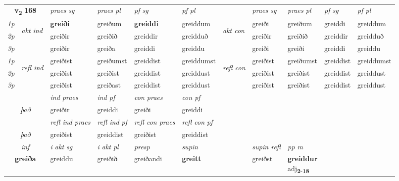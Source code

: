 \noindent
\begin{tabular}{lllllllllll} \toprule
\multicolumn{2}{c}{\textbf{v{\textsubscript{2}}} \Large{\textbf{168}}}  &  \textit{praes sg}  & \textit{praes pl}  &\textit{ pf sg} & \textit{pf pl} &  &  \textit{praes sg}  & \textit{praes pl}  & \textit{pf sg} & \textit{pf pl } \\*
	\cmidrule{3-6} \cmidrule{8-11}
 {\textit{1p}} & \multirow{3}{*}{\begin{turn}{90}\textit{akt ind}\end{turn}} & \textbf{greiði} & greiðum & \textbf{greiddi} & greiddum & \multirow{3}{*}{\begin{turn}{90}\textit{akt con}\end{turn}} &greiði & greiðum & greiddi & greiddum\\*
 {\textit{2p}} &  &  greiðir  & greiðið & greiddir & greidduð & & greiðir & greiðið & greiddir & greidduð \\*
{\textit{3p}} &  & greiðir & greiða & greiddi & greiddu & & greiði & greiði& greiddi & greiddu \\*
\cmidrule{3-6} \cmidrule{8-11}
 {\textit{1p}} & \multirow{3}{*}{\begin{turn}{90}\textit{refl ind}\end{turn}}  & greiðist & greiðumst & greiddist & greiddumst & \multirow{3}{*}{\begin{turn}{90}\textit{refl con}\end{turn}}  &greiðist & greiðumst & greiddist & greiddumst \\*
 {\textit{2p}} &  & greiðist & greiðist & greiddist & greiddust & &greiðist & greiðist & greiddist & greiddust \\*
 {\textit{3p}}  & & greiðist & greiðast & greiddist & greiddust & & greiðist & greiðist& greiddist & greiddust \\*
\cmidrule{3-6} \cmidrule{8-11}

   & &  \textit{ind praes} & \textit{ind pf} & \textit{con praes} & \textit{con pf} \\*
\multicolumn{2}{c}{ \textit{það} } & greiðir & greiddi & greiði & greiddi \\*

\cmidrule{3-6}
 & & \textit{refl ind praes} & \textit{refl ind pf} & \textit{refl con praes} & \textit{refl con pf} \\*
 \multicolumn{2}{c}{ \textit{það} }& greiðist & greiddist & greiðist & greiddist \\*

\cmidrule{3-9}
   \multicolumn{2}{c}{\textit{inf}}  & \textit{i akt sg} & \textit{i akt pl}   & \textit{presp} & \textit{supin} && \textit{supin refl} & \textit{pp m} \\*
  \multicolumn{2}{c}{\textbf{greiða}} & greiddu  & greiðið   & greiðandi &  \textbf{greitt} && greiðst & \specialcell{\textbf{greiddur} \\ adj\textbf{\textsubscript{2-18}}} \\*
\end{tabular}

